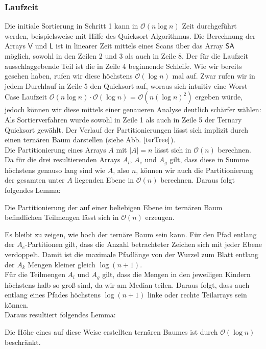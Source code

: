 \subsubsection{Laufzeit}
Die initiale Sortierung in Schritt 1 kann in $\mathcal{O}(n\log n)$ Zeit durchgeführt werden, beispielsweise mit Hilfe des Quicksort-Algorithmus. Die Berechnung der Arrays $\mathsf{V}$ und $\mathsf{L}$ ist in linearer Zeit mittels eines Scans über das Array $\mathsf{SA}$ möglich, sowohl in den Zeilen 2 und 3 als auch in Zeile 8. Der für die Laufzeit ausschlaggebende Teil ist die in Zeile 4 beginnende Schleife. Wie wir bereits gesehen haben, rufen wir diese höchstens $\mathcal{O}(\log n)$ mal auf. Zwar rufen wir in jedem Durchlauf in Zeile 5 den Quicksort auf, woraus sich intuitiv eine Worst-Case Laufzeit $\mathcal{O}(n\log  n)\cdot \mathcal{O}(\log n)$ = $\mathcal{O}(n(\log n)^2)$ ergeben würde, jedoch können wir diese mittels einer genaueren Analyse deutlich schärfer wählen:\\
Als Sortierverfahren wurde sowohl in Zeile 1 als auch in Zeile 5 der Ternary Quicksort gewählt. Der Verlauf der Partitionierungen lässt sich implizit durch einen ternären Baum darstellen (siehe Abb. $\ref{terTree}$).\\
Die Partitionierung eines Arrays $A$ mit $|A|=n$ lässt sich in $\mathcal{O}(n)$ berechnen. Da für die drei resultierenden Arrays $A_l$, $A_e$ und $A_g$ gilt, dass diese in Summe höchstens genauso lang sind wie $A$, also $n$, können wir auch die Partitionierung der gesamten unter $A$ liegenden Ebene in $\mathcal{O}(n)$ berechnen. Daraus folgt folgendes Lemma:
\begin{lemma}
Die Partitionierung der auf einer beliebigen Ebene im ternären Baum befindlichen Teilmengen lässt sich in $\mathcal{O}(n)$ erzeugen. 
\end{lemma}
Es bleibt zu zeigen, wie hoch der ternäre Baum sein kann. Für den Pfad entlang der $A_e$-Partitionen gilt, dass die Anzahl betrachteter Zeichen sich mit jeder Ebene verdoppelt. Damit ist die maximale Pfadlänge von der Wurzel zum Blatt entlang der $A_k$ Mengen kleiner gleich $ \log (n+1)$.\\
Für die Teilmengen $A_l$ und $A_g$ gilt, dass die Mengen in den jeweiligen Kindern höchstens halb so groß sind, da wir am Median teilen. Daraus folgt, dass auch entlang eines Pfades höchstens $\log (n+1)$ linke oder rechte Teilarrays sein können.\\
Daraus resultiert folgendes Lemma:
\begin{lemma}
Die Höhe eines auf diese Weise erstellten ternären Baumes ist durch $\mathcal{O}(\log n)$ beschränkt.
\end{lemma}
